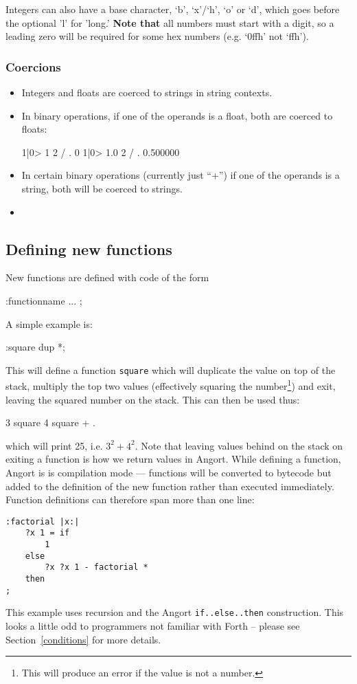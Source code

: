 Integers can also have a base character, `b', `x'/`h', `o' or `d', which
goes before the optional 'l' for 'long.' \textbf{Note that} all numbers
must start with a digit, so a leading zero will be required for some 
hex numbers (e.g. `0ffh' not `ffh').



\clearpage
\subsubsection{Coercions}
\begin{itemize}
\item Integers and floats are coerced to strings in string contexts.
\item In binary operations, if one of the operands is a float, both are coerced to floats:
\begin{v}
1|0> 1 2 / .
0
1|0> 1.0 2 / .
0.500000
\end{v}
\item In certain binary operations (currently just ``+'') if one of the operands
is a string, both will be coerced to strings.
\item {}
\end{itemize}

\subsection{Defining new functions}
New functions are defined with code of the form
\begin{v}
:functionname ... ;
\end{v}
A simple example is:
\begin{v}
:square dup *;
\end{v}
This will define a function \texttt{square} which will duplicate
the value on top of the stack, multiply the top two values
(effectively squaring the number\footnote{This will produce
an error if the value is not a number.}) and exit, leaving the
squared number on the stack. This can then be used thus:
\begin{v}
3 square 4 square + .
\end{v}
which will print 25, i.e. $3^2+4^2$. Note that leaving values behind
on the stack on exiting a function is how we return values in Angort.
While defining a function, Angort is is compilation mode --- functions will
be converted to bytecode but added to the definition of the new function
rather than executed immediately. Function definitions can therefore span
more than one line:
\begin{lstlisting}
:factorial |x:|
    ?x 1 = if
        1
    else
        ?x ?x 1 - factorial *
    then
;  
\end{lstlisting}
This example uses recursion and the Angort \texttt{if..else..then} construction.
This looks a little odd to programmers not familiar with Forth -- please
see Section~\ref{conditions} for more details.


